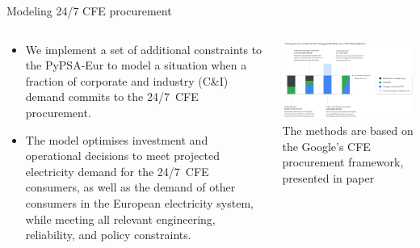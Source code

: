 \begin{frame}{Modeling 24/7 CFE procurement}
  \begin{columns}[T]
  \begin{column}{7cm}
  {\small

  \begin{itemize}
  \item We implement a set of additional constraints to the PyPSA-Eur 
  to model a situation when a fraction of corporate and industry (C\&I) demand 
  commits to the 24/7~CFE procurement.
  \item The model optimises investment and operational decisions to meet projected
  electricity demand for the 24/7~CFE consumers, as well as
  the demand of other consumers in the European electricity system, while meeting all
  relevant engineering, reliability, and policy constraints.
  \end{itemize}
  }
  \end{column}

  \begin{column}{9cm}
  \centering
  \includegraphics[width=8.5cm]{images/247-concept.png}
  {\footnotesize
  The methods are based on the Google's CFE procurement framework, presented in paper
  }
  \end{column}

  \end{columns}

\end{frame}



